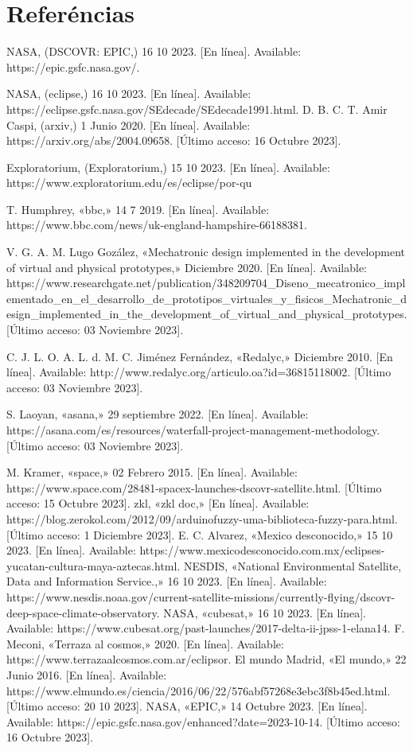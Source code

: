 \chapter{Referéncias}

NASA, (DSCOVR: EPIC,) 16 10 2023. [En línea]. Available: https://epic.gsfc.nasa.gov/.

NASA, (eclipse,) 16 10 2023. [En línea]. Available: https://eclipse.gsfc.nasa.gov/SEdecade/SEdecade1991.html.
D. B. C. T. Amir Caspi, (arxiv,) 1 Junio 2020. [En línea]. Available: https://arxiv.org/abs/2004.09658. [Último acceso: 16 Octubre 2023].

Exploratorium, (Exploratorium,) 15 10 2023. [En línea]. Available: https://www.exploratorium.edu/es/eclipse/por-qu%

T. Humphrey, «bbc,» 14 7 2019. [En línea]. Available: https://www.bbc.com/news/uk-england-hampshire-66188381.

V. G. A. M. Lugo Gozález, «Mechatronic design implemented in the development of virtual and physical prototypes,» Diciembre 2020. [En línea]. Available: https://www.researchgate.net/publication/348209704_Diseno_mecatronico_implementado_en_el_desarrollo_de_prototipos_virtuales_y_fisicos_Mechatronic_design_implemented_in_the_development_of_virtual_and_physical_prototypes. [Último acceso: 03 Noviembre 2023].

C. J. L. O. A. L. d. M. C. Jiménez Fernández, «Redalyc,» Diciembre 2010. [En línea]. Available: http://www.redalyc.org/articulo.oa?id=36815118002. [Último acceso: 03 Noviembre 2023].

S. Laoyan, «asana,» 29 septiembre 2022. [En línea]. Available: https://asana.com/es/resources/waterfall-project-management-methodology. [Último acceso: 03 Noviembre 2023].

M. Kramer, «space,» 02 Febrero 2015. [En línea]. Available: https://www.space.com/28481-spacex-launches-dscovr-satellite.html. [Último acceso: 15 Octubre 2023].
zkl, «zkl doc,» [En línea]. Available: https://blog.zerokol.com/2012/09/arduinofuzzy-uma-biblioteca-fuzzy-para.html. [Último acceso: 1 Diciembre 2023].
E. C. Alvarez, «Mexico desconocido,» 15 10 2023. [En línea]. Available: https://www.mexicodesconocido.com.mx/eclipses-yucatan-cultura-maya-aztecas.html.
NESDIS, «National Environmental Satellite, Data and Information Service.,» 16 10 2023. [En línea]. Available: https://www.nesdis.noaa.gov/current-satellite-missions/currently-flying/dscovr-deep-space-climate-observatory.
NASA, «cubesat,» 16 10 2023. [En línea]. Available: https://www.cubesat.org/past-launches/2017-delta-ii-jpss-1-elana14.
F. Meconi, «Terraza al cosmos,» 2020. [En línea]. Available: https://www.terrazaalcosmos.com.ar/eclipsor.
El mundo Madrid, «El mundo,» 22 Junio 2016. [En línea]. Available: https://www.elmundo.es/ciencia/2016/06/22/576abf57268e3ebc3f8b45ed.html. [Último acceso: 20 10 2023].
NASA, «EPIC,» 14 Octubre 2023. [En línea]. Available: https://epic.gsfc.nasa.gov/enhanced?date=2023-10-14. [Último acceso: 16 Octubre 2023].
